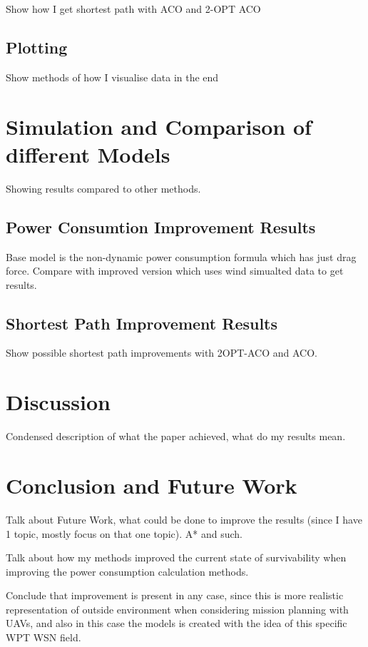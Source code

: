 \documentclass[11pt,a4paper,footinclude=true,headinclude=true, oneside]{scrbook}
\begin{document}
Show how I get shortest path with ACO and 2-OPT ACO

\section{Plotting}

Show methods of how I visualise data in the end

\chapter{Simulation and Comparison of different Models}

Showing results compared to other methods.

\section{Power Consumtion Improvement Results}
Base model is the non-dynamic power consumption formula which has just drag force. Compare with improved version which uses wind simualted data to get results.

\section{Shortest Path Improvement Results}
Show possible shortest path improvements with 2OPT-ACO and ACO.

\chapter{Discussion}

Condensed description of what the paper achieved, what do my results mean.

\chapter{Conclusion and Future Work}

Talk about Future Work, what could be done to improve the results (since I have 1 topic, mostly focus on that one topic). A* and such.

Talk about how my methods improved the current state of survivability when improving the power consumption calculation methods.

Conclude that improvement is present in any case, since this is more realistic representation of outside environment when considering mission planning with UAVs, and also in this case the models is created with the idea of this specific WPT WSN field.
\end{document}
